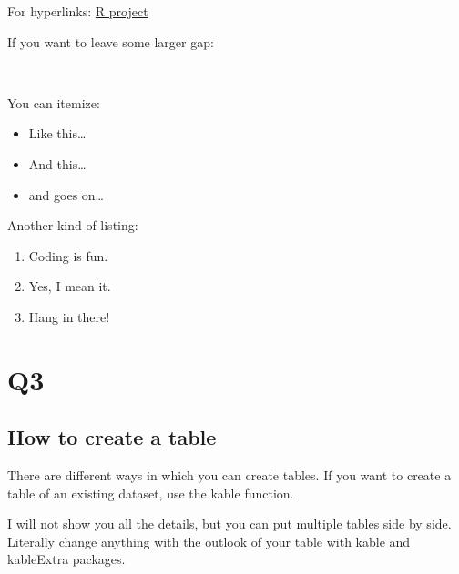 \documentclass[
]{article}
\providecommand{\tightlist}{%
  \setlength{\itemsep}{0pt}\setlength{\parskip}{0pt}}
\begin{document}
For hyperlinks: \href{https://www.r-project.org/}{R project}

If you want to leave some larger gap:

\(~\)

You can itemize:

\begin{itemize}
\tightlist
\item
  Like this\ldots{}
\item
  And this\ldots{}
\item
  and goes on\ldots{}
\end{itemize}

Another kind of listing:

\begin{enumerate}
\def\labelenumi{\arabic{enumi}.}
\tightlist
\item
  Coding is fun.
\item
  Yes, I mean it.
\item
  Hang in there!
\end{enumerate}

\hypertarget{q3}{%
\section{Q3}\label{q3}}

\hypertarget{how-to-create-a-table}{%
\subsection{How to create a table}\label{how-to-create-a-table}}

There are different ways in which you can create tables. If you want to
create a table of an existing dataset, use the kable function.

I will not show you all the details, but you can put multiple tables
side by side. Literally change anything with the outlook of your table
with kable and kableExtra packages.
\end{document}
